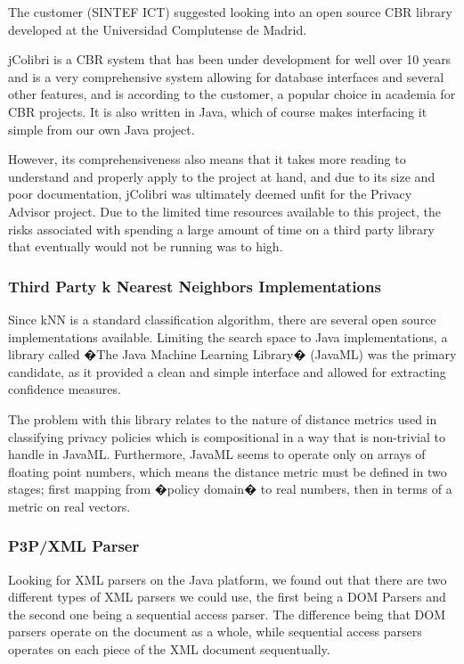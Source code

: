 The customer (SINTEF ICT) suggested looking into an open source CBR library developed at the Universidad Complutense de Madrid.
 
jColibri is a CBR system that has been under development for well over 10 years and is a very comprehensive system allowing for database interfaces and several other features,  and is according to the customer, a popular choice in academia for CBR projects. It is also written in Java, which of course makes interfacing it simple from our own Java project.
 
However, its comprehensiveness also means that it takes more reading to understand and properly apply to the project at hand, and due to its size and poor documentation, jColibri was ultimately deemed unfit for the Privacy Advisor project. Due to the limited time resources available to this project, the risks associated with spending a large amount of time on a third party library that eventually would not be running was to high.
 
\subsubsection{Third Party k Nearest Neighbors Implementations}
Since kNN is a standard classification algorithm, there are several open source implementations available. Limiting the search space to Java implementations, a library called �The Java Machine Learning Library� (JavaML) was the primary candidate, as it provided a clean and simple interface and allowed for extracting confidence measures.
 
The problem with this library relates to the nature of distance metrics used in classifying privacy policies which is compositional in a way that is non-trivial to handle in JavaML. Furthermore, JavaML seems to operate only on arrays of floating point numbers, which means the distance metric must be defined in two stages; first mapping from �policy domain� to real numbers, then in terms of a metric on real vectors.

\subsubsection{P3P/XML Parser}
Looking for XML parsers on the Java platform, we found out that there are two different types of XML parsers we could use, the first being a DOM Parsers and the second one being a sequential access parser. The difference being that DOM parsers operate on the document as a whole, while sequential access parsers operates on each piece of the XML document sequentually.

